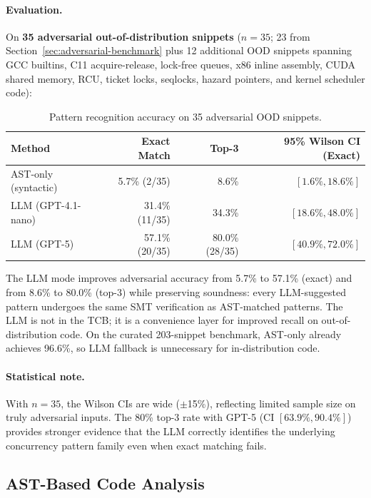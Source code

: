 \documentclass[11pt]{article}
\begin{document}
\paragraph{Evaluation.}
On \textbf{35 adversarial out-of-distribution snippets} ($n=35$;
23 from Section~\ref{sec:adversarial-benchmark} plus 12 additional
OOD snippets spanning GCC builtins, C11 acquire-release, lock-free
queues, x86 inline assembly, CUDA shared memory, RCU, ticket locks,
seqlocks, hazard pointers, and kernel scheduler code):

\begin{table}[ht]
\centering
\caption{Pattern recognition accuracy on 35 adversarial OOD snippets.}
\label{tab:llm-accuracy}
\small
\begin{tabular}{lrrr}
\toprule
\textbf{Method} & \textbf{Exact Match} & \textbf{Top-3} & \textbf{95\% Wilson CI (Exact)} \\
\midrule
AST-only (syntactic)      & 5.7\% (2/35)  & 8.6\% & $[1.6\%, 18.6\%]$ \\
LLM (GPT-4.1-nano)        & 31.4\% (11/35) & 34.3\% & $[18.6\%, 48.0\%]$ \\
LLM (GPT-5)               & 57.1\% (20/35) & 80.0\% (28/35) & $[40.9\%, 72.0\%]$ \\
\bottomrule
\end{tabular}
\end{table}

\noindent
The LLM mode improves adversarial accuracy from 5.7\% to 57.1\%
(exact) and from 8.6\% to 80.0\% (top-3)
while preserving soundness: every LLM-suggested pattern undergoes
the same SMT verification as AST-matched patterns.
The LLM is not in the TCB; it is a convenience layer for improved
recall on out-of-distribution code.
On the curated 203-snippet benchmark, AST-only already achieves
96.6\%, so LLM fallback is unnecessary for in-distribution code.

\paragraph{Statistical note.}
With $n=35$, the Wilson CIs are wide ($\pm$15\%), reflecting limited
sample size on truly adversarial inputs. The 80\% top-3 rate
with GPT-5 (CI $[63.9\%, 90.4\%]$) provides stronger evidence
that the LLM correctly identifies the underlying concurrency
pattern family even when exact matching fails.

\subsection{AST-Based Code Analysis}
\label{sec:code-analysis}
\end{document}
